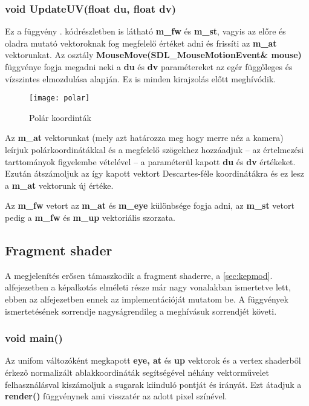 \subsubsection{void UpdateUV(float du, float dv)}

Ez a függvény . kódrészletben is látható \textbf{m\_fw} és \textbf{m\_st}, vagyis az előre és oladra mutató vektoroknak fog megfelelő értéket adni és frissíti az \textbf{m\_at} vektorunkat. Az osztály \textbf{MouseMove(SDL\_MouseMotionEvent\& mouse)} függvénye fogja megadni neki a \textbf{du} és \textbf{dv} paramétereket az egér függőleges és vízszintes elmozdulása alapján. Ez is minden kirajzolás előtt meghívódik.

\begin{figure}[H]
	\centering
	\texttt{[image: polar]}
	\caption{Polár koordinták \cite{Spherica72:online}}
	\label{fig:polar}
\end{figure}

Az \textbf{m\_at} vektorunkat (mely azt határozza meg hogy merre néz a kamera) leírjuk polárkoordinátákkal és a megfelelő szögekhez hozzáadjuk -- az értelmezési tarttományok figyelembe vételével -- a paraméterül kapott \textbf{du} és \textbf{dv} értékeket. Ezután átszámoljuk az így kapott vektort Descartes-féle koordinátákra és ez lesz a \textbf{m\_at} vektorunk új értéke.

Az \textbf{m\_fw} vetort az \textbf{m\_at} és \textbf{m\_eye} különbsége fogja adni, az \textbf{m\_st} vetort pedig a \textbf{m\_fw} és \textbf{m\_up} vektoriális szorzata.

\subsection{Fragment shader}
A megjelenítés erősen támaszkodik a fragment shaderre, a \ref{sec:kepmod}. alfejezetben a képalkotás elméleti része már nagy vonalakban ismertetve lett, ebben az alfejezetben ennek az implementációját mutatom be. A függvények ismertetésének sorrendje nagyságrendileg a meghívásuk sorrendjét követi.

\subsubsection{void main()}
Az unifom változóként megkapott \textbf{eye, at} és \textbf{up} vektorok és a vertex shaderből érkező normalizált ablakkoordináták segítségével néhány vektorművelet felhasználásval kiszámoljuk a sugarak kiinduló pontját és irányát. Ezt átadjuk a \textbf{render()} függvénynek ami visszatér az adott pixel színével.


